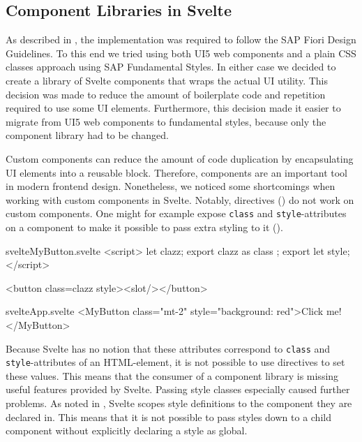 \subsection{Component Libraries in Svelte}
\label{sec:evaluation-ui-libs}
As described in , the implementation was required to follow the SAP Fiori Design Guidelines. To this end we tried using both UI5 web components and a plain CSS classes approach using SAP Fundamental Styles. In either case we decided to create a library of Svelte components that wraps the actual UI utility. This decision was made to reduce the amount of boilerplate code and repetition required to use some UI elements. Furthermore, this decision made it easier to migrate from UI5 web components to fundamental styles, because only the component library had to be changed. 

Custom components can reduce the amount of code duplication by encapsulating UI elements into a reusable block. Therefore, components are an important tool in modern frontend design. Nonetheless, we noticed some shortcomings when working with custom components in Svelte. Notably, directives () do not work on custom components. One might for example expose \texttt{class} and \texttt{style}-attributes on a component to make it possible to pass extra styling to it ().

\begin{listing}[H]
\begin{myminted}{svelte}{MyButton.svelte}
<script>
  let clazz;
  export { clazz as class };
  export let style;
</script>

<button class={clazz} {style}><slot/></button>
\end{myminted}
\begin{myminted}{svelte}{App.svelte}
<MyButton class="mt-2" style="background: red">Click me!</MyButton>
\end{myminted}
\caption{Svelte Component that provides a class and style attribute.}
\label{fig:evaluation-svelte-component-style}
\end{listing}

Because Svelte has no notion that these attributes correspond to \texttt{class} and \texttt{style}-attributes of an HTML-element, it is not possible to use directives to set these values. This means that the consumer of a component library is missing useful features provided by Svelte. Passing style classes especially caused further problems. As noted in , Svelte scopes style definitions to the component they are declared in. This means that it is not possible to pass styles down to a child component without explicitly declaring a style as global.

